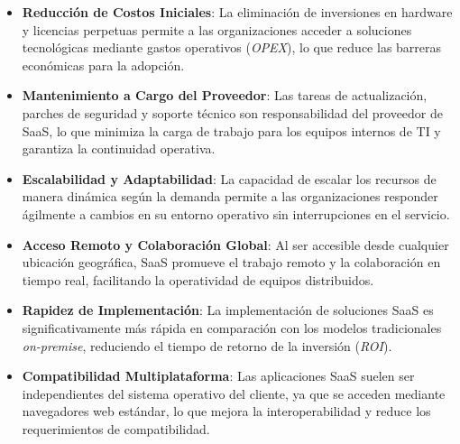 {                \begin{itemize}
                    \item \textbf{Reducción de Costos Iniciales}: La eliminación de inversiones en hardware y licencias perpetuas permite a las organizaciones acceder a soluciones tecnológicas mediante gastos operativos (\textit{OPEX}), lo que reduce las barreras económicas para la adopción.
                    \item \textbf{Mantenimiento a Cargo del Proveedor}: Las tareas de actualización, parches de seguridad y soporte técnico son responsabilidad del proveedor de SaaS, lo que minimiza la carga de trabajo para los equipos internos de TI y garantiza la continuidad operativa.
                    \item \textbf{Escalabilidad y Adaptabilidad}: La capacidad de escalar los recursos de manera dinámica según la demanda permite a las organizaciones responder ágilmente a cambios en su entorno operativo sin interrupciones en el servicio.
                    \item \textbf{Acceso Remoto y Colaboración Global}: Al ser accesible desde cualquier ubicación geográfica, SaaS promueve el trabajo remoto y la colaboración en tiempo real, facilitando la operatividad de equipos distribuidos.
                    \item \textbf{Rapidez de Implementación}: La implementación de soluciones SaaS es significativamente más rápida en comparación con los modelos tradicionales \textit{on-premise}, reduciendo el tiempo de retorno de la inversión (\textit{ROI}).
                    \item \textbf{Compatibilidad Multiplataforma}: Las aplicaciones SaaS suelen ser independientes del sistema operativo del cliente, ya que se acceden mediante navegadores web estándar, lo que mejora la interoperabilidad y reduce los requerimientos de compatibilidad.
                \end{itemize}
                
}
